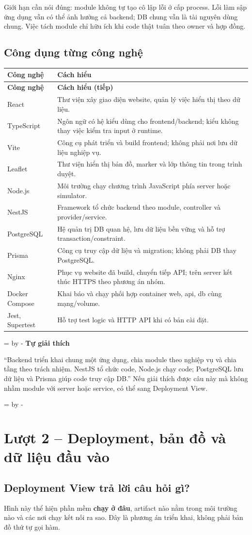\documentclass[12pt,a4paper]{article}
\newcommand{\Needspace}[1]{%
  \par\begingroup\dimen0=\pagegoal\advance\dimen0 by -\pagetotal
  \ifdim\dimen0<#1\relax\newpage\fi\endgroup}
\newcommand{\Lesson}[1]{\par\bigskip\Needspace{0.52\textheight}\section{#1}}
\newcommand{\Point}[1]{\par\medskip\Needspace{4\baselineskip}\noindent\textbf{#1}\par\nobreak\smallskip}
\newenvironment{PairTable}[2]{%
  \begin{longtable}{|L{39mm}|L{106mm}|}\hline
  \textbf{#1} & \textbf{#2}\\\hline\endfirsthead
  \hline\textbf{#1} & \textbf{#2 (tiếp)}\\\hline\endhead
}{\end{longtable}}
\begin{document}
Giới hạn cần nói đúng: module không tự tạo cô lập lỗi ở cấp process. Lỗi làm sập ứng dụng vẫn có thể ảnh hưởng cả backend; DB chung vẫn là tài nguyên dùng chung. Việc tách module chỉ hữu ích khi code thật tuân theo owner và hợp đồng.

\subsection{Công dụng từng công nghệ}
\begin{PairTable}{Công nghệ}{Cách hiểu}
React & Thư viện xây giao diện website, quản lý việc hiển thị theo dữ liệu.\\\hline
TypeScript & Ngôn ngữ có hệ kiểu dùng cho frontend/backend; kiểu không thay việc kiểm tra input ở runtime.\\\hline
Vite & Công cụ phát triển và build frontend; không phải nơi lưu dữ liệu nghiệp vụ.\\\hline
Leaflet & Thư viện hiển thị bản đồ, marker và lớp thông tin trong trình duyệt.\\\hline
Node.js & Môi trường chạy chương trình JavaScript phía server hoặc simulator.\\\hline
NestJS & Framework tổ chức backend theo module, controller và provider/service.\\\hline
PostgreSQL & Hệ quản trị DB quan hệ, lưu dữ liệu bền vững và hỗ trợ transaction/constraint.\\\hline
Prisma & Công cụ truy cập dữ liệu và migration; không phải DB thay PostgreSQL.\\\hline
Nginx & Phục vụ website đã build, chuyển tiếp API; trên server kết thúc HTTPS theo phương án nhóm.\\\hline
Docker Compose & Khai báo và chạy phối hợp container web, api, db cùng mạng/volume.\\\hline
Jest, Supertest & Hỗ trợ test logic và HTTP API khi có bản cài đặt.\\\hline
\end{PairTable}

\Point{Tự giải thích}
``Backend triển khai chung một ứng dụng, chia module theo nghiệp vụ và chia tầng theo trách nhiệm. NestJS tổ chức code, Node.js chạy code; PostgreSQL lưu dữ liệu và Prisma giúp code truy cập DB.'' Nếu giải thích được câu này mà không nhầm module với server hoặc service, có thể sang Deployment View.

\Lesson{Lượt 2 -- Deployment, bản đồ và dữ liệu đầu vào}
\subsection{Deployment View trả lời câu hỏi gì?}
Hình này thể hiện phần mềm \textbf{chạy ở đâu}, artifact nào nằm trong môi trường nào và các nơi chạy kết nối ra sao. Đây là phương án triển khai, không phải bản đồ thứ tự gọi hàm.
\end{document}
